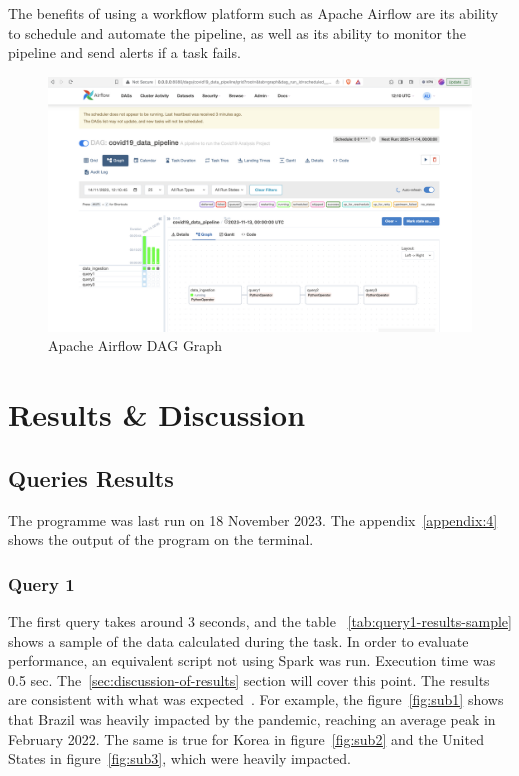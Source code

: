 \documentclass[12pt,oneside]{book} %
\begin{document}
The benefits of using a workflow platform such as Apache Airflow are its
ability to schedule and automate the pipeline, as well as its ability to
monitor the pipeline and send alerts if a task fails.

\begin{figure}[h]
    \centering
    \includegraphics[width=1\linewidth]{images/Screenshot 2023-11-14 at 12.10.48.png}
    \caption{Apache Airflow DAG Graph}\label{fig:apache-airflow}
\end{figure}

\newpage
\chapter{Results \& Discussion}

\section{Queries Results}
The programme was last run on 18 November 2023. The appendix~\ref{appendix:4}
shows the output of the program on the terminal.

\subsection{Query 1}

The first query takes around 3 seconds, and the table
~\ref{tab:query1-results-sample} shows a sample of the data calculated during
the task. In order to evaluate performance, an equivalent script not using
Spark was run. Execution time was 0.5 sec. The~\ref{sec:discussion-of-results}
section will cover this point. The results are consistent with what was
expected~\cite{NYT}. For example, the figure~\ref{fig:sub1} shows that Brazil
was heavily impacted by the pandemic, reaching an average peak in February
2022. The same is true for Korea in figure~\ref{fig:sub2} and the United States
in figure~\ref{fig:sub3}, which were heavily impacted.
\end{document}
